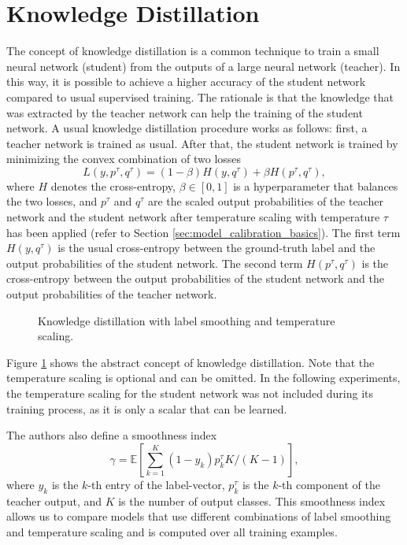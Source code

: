 \section{Knowledge Distillation}\label{sec:kd}
The concept of knowledge distillation \citep{hinton2015} is a common technique to train a small neural network (student) from the outputs of a large neural network (teacher). In this way, it is possible to achieve a higher accuracy of the student network compared to usual supervised training. The rationale is that the knowledge that was extracted by the teacher network can help the training of the student network.  
A usual knowledge distillation procedure works as follows: first, a teacher network is trained as usual. After that, the student network is trained by minimizing the convex combination of two losses
\begin{equation}
    \label{eq:dist_loss}
    L(y, p^\tau, q^\tau)=(1-\beta) H(y,q^\tau) + \beta H(p^\tau, q^\tau),
\end{equation}
where $H$ denotes the cross-entropy, $\beta\in [0,1]$ is a hyperparameter that balances the two losses, and $p^\tau$ and $q^\tau$ are the scaled output probabilities of the teacher network and the student network after temperature scaling with temperature $\tau$ has been applied (refer to Section \ref{sec:model_calibration_basics}). The first term $H(y,q^\tau)$ is the usual cross-entropy between the ground-truth label and the output probabilities of the student network. The second term $H(p^\tau, q^\tau)$ is the cross-entropy between the output probabilities of the student network and the output probabilities of the teacher network.
\begin{figure}[ht]
    \centering
    
    \caption{Knowledge distillation with label smoothing and temperature scaling.}
    \label{fig:distillation_diagram}
\end{figure}
Figure \ref{fig:distillation_diagram} shows the abstract concept of knowledge distillation. Note that the temperature scaling is optional and can be omitted. In the following experiments, the temperature scaling for the student network was not included during its training process, as it is only a scalar that can be learned.

The authors also define a smoothness index 
 \begin{equation}
    \label{eq:dist_smooth}
    \gamma = \mathbb{E}\left\lbrack \sum_{k=1}^K(1-y_k)p_k^\tau K/(K-1)\right\rbrack,
\end{equation}
where $y_k$ is the $k$-th entry of the label-vector, $p_k^\tau$ is the $k$-th component of the teacher output, and $K$ is the number of output classes. This smoothness index allows us to compare models that use different combinations of label smoothing and temperature scaling and is computed over all training examples.

